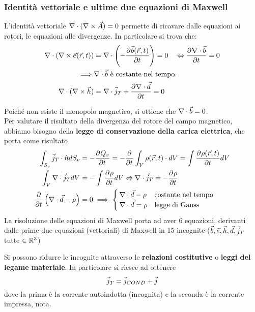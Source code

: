 \subsubsection{Identità vettoriale e ultime due equazioni di Maxwell}
L'identità vettoriale $\nabla\cdot (\nabla\times \vec{A}) = 0$ permette di ricavare
dalle equazioni ai rotori, le equazioni alle divergenze. In particolare si trova che:
\begin{equation}\begin{split}
  \nabla\cdot (\nabla\times \vec{e}(\vec{r},t)) &= \nabla\cdot \left(-\frac{\partial^{} {\vec{b}(\vec{r},t)}}{\partial {t}^{}}\right)=0 \quad \Leftrightarrow \frac{\partial^{} {\nabla\cdot \vec{b}}}{\partial {t}^{}}=0\\
  \implies & \nabla\cdot \vec{b} \text{ è costante nel tempo.}\\
  \nabla\cdot(\nabla\times \vec{h}) &= \nabla\cdot \vec{j}_T + \frac{\partial^{} {\nabla\cdot \vec{d}}}{\partial {t}^{}}=0
\end{split}\end{equation}

Poiché non esiste il monopolo magnetico, si ottiene che $\nabla\cdot\vec{b} =0$.\\
Per valutare il risultato della divergenza del rotore del campo magnetico, abbiamo bisogno della
\textbf{legge di conservazione della carica elettrica}, che porta come risultato
\begin{equation}\begin{split}
  \int_{S_v}\vec{j}_T \cdot \hat{n} d S_v &= -\frac{\partial^{} {Q_v}}{\partial {t}^{}} = -\frac{\partial^{} {}}{\partial {t}^{}} \int_V \rho(\vec{r},t) \cdot dV = \int \frac{\partial^{} {\rho(\vec{r},t)}}{\partial {t}^{}} dV\\
  \int_V \nabla\cdot \vec{j}_T dV &= - \int \frac{\partial^{} {\rho}}{\partial {t}^{}} dV \Leftrightarrow \nabla\cdot \vec{j}_T = -\frac{\partial^{} {\rho}}{\partial {t}^{}} \\
  \frac{\partial^{} {}}{\partial {t}^{}} \left(\nabla\cdot \vec{d} - \rho \right) &=0 \implies
  \begin{cases}
    \nabla\cdot \vec{d} - \rho & \text{costante nel tempo} \\
    \nabla\cdot \vec{d} = \rho & \text{legge di Gauss}
  \end{cases}
\end{split}\end{equation}
La risoluzione delle equazioni di Maxwell porta ad aver 6 equazioni, derivanti
dalle prime due equazioni (vettoriali) di Maxwell in 15 incognite ($\vec{b} , \vec{e} , \vec{h} , \vec{d} , \vec{j}_T $ tutte $\in \mathbb{R}^3$)

Si possono ridurre le incognite attraverso le \textbf{relazioni costitutive} o
\textbf{leggi del legame materiale}. In particolare si riesce ad ottenere
\begin{equation}
  \vec{j}_T = \vec{j}_{COND} + \vec{j}
\end{equation}
dove la prima è la corrente autoindotta (incognita) e la seconda è la corrente impressa, nota.

